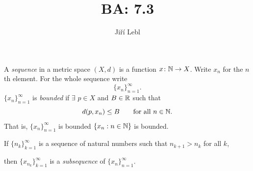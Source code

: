 \documentclass[10pt,aspectratio=169]{beamer}
\author{Ji\v{r}\'i Lebl}
\institute[OSU]{%
Departemento pri Matematiko de Oklahoma {\^S}tata Universitato}
\title{BA: 7.3}
\date{}
\begin{document}
\begin{frame}
\titlepage
\end{frame}

\begin{frame}
\begin{definition}
A \emph{sequence} in a metric space $(X,d)$ is a function
$x \colon {\mathbb{N}} \to X$.
\pause
Write $x_n$ for the $n$th element.
\pause
For the whole sequence write
\begin{equation*}
\{ x_n \}_{n=1}^\infty .
\end{equation*}
\pause
$\{ x_n \}_{n=1}^\infty$ is \emph{bounded} if
$\exists$ $p \in X$ and $B \in {\mathbb{R}}$ such that
\begin{equation*}
d(p,x_n) \leq B \qquad \text{for all } n \in {\mathbb{N}}.
\end{equation*}
\pause
That is, $\{x_n\}_{n=1}^\infty$ is bounded \wiffif
$\{ x_n : n \in {\mathbb{N}} \}$ is bounded.

\pause
\medskip

If $\{ n_k \}_{k=1}^\infty$ is a sequence of natural numbers
such that $n_{k+1} > n_k$ for all $k$,

then $\{ x_{n_k} \}_{k=1}^\infty$
is a \emph{subsequence} of $\{x_n \}_{n=1}^\infty$.
\end{definition}

\end{frame}
\end{document}

